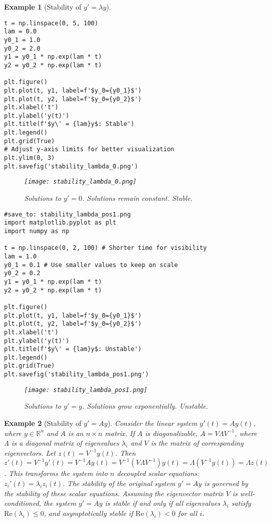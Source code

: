 \documentclass{article}
\newtheorem{example}{Example}
\begin{document}
\begin{example}[Stability of $y' = \lambda y$]
\begin{verbatim}
t = np.linspace(0, 5, 100)
lam = 0.0
y0_1 = 1.0
y0_2 = 2.0
y1 = y0_1 * np.exp(lam * t)
y2 = y0_2 * np.exp(lam * t)

plt.figure()
plt.plot(t, y1, label=f'$y_0={y0_1}$')
plt.plot(t, y2, label=f'$y_0={y0_2}$')
plt.xlabel('t')
plt.ylabel('y(t)')
plt.title(f'$y\' = {lam}y$: Stable')
plt.legend()
plt.grid(True)
# Adjust y-axis limits for better visualization
plt.ylim(0, 3)
plt.savefig('stability_lambda_0.png')
\end{verbatim}

\begin{figure}[h]
    \centering
    \texttt{[image: stability\_lambda\_0.png]}
    \caption{Solutions to $y'=0$. Solutions remain constant. Stable.}
    \label{fig:stability_lambda_0}
\end{figure}

\begin{verbatim}
#save_to: stability_lambda_pos1.png
import matplotlib.pyplot as plt
import numpy as np

t = np.linspace(0, 2, 100) # Shorter time for visibility
lam = 1.0
y0_1 = 0.1 # Use smaller values to keep on scale
y0_2 = 0.2
y1 = y0_1 * np.exp(lam * t)
y2 = y0_2 * np.exp(lam * t)

plt.figure()
plt.plot(t, y1, label=f'$y_0={y0_1}$')
plt.plot(t, y2, label=f'$y_0={y0_2}$')
plt.xlabel('t')
plt.ylabel('y(t)')
plt.title(f'$y\' = {lam}y$: Unstable')
plt.legend()
plt.grid(True)
plt.savefig('stability_lambda_pos1.png')
\end{verbatim}

\begin{figure}[h]
    \centering
    \texttt{[image: stability\_lambda\_pos1.png]}
    \caption{Solutions to $y'=y$. Solutions grow exponentially. Unstable.}
    \label{fig:stability_lambda_pos1}
\end{figure}

\end{example}

\begin{example}[Stability of $y' = Ay$]
Consider the linear system $y'(t) = Ay(t)$, where $y \in \mathbb{R}^n$ and $A$ is an $n \times n$ matrix. If $A$ is diagonalizable, $A = V \Lambda V^{-1}$, where $\Lambda$ is a diagonal matrix of eigenvalues $\lambda_i$ and $V$ is the matrix of corresponding eigenvectors. Let $z(t) = V^{-1} y(t)$. Then $z'(t) = V^{-1} y'(t) = V^{-1} A y(t) = V^{-1} (V \Lambda V^{-1}) y(t) = \Lambda (V^{-1} y(t)) = \Lambda z(t)$.
This transforms the system into $n$ decoupled scalar equations: $z_i'(t) = \lambda_i z_i(t)$. The stability of the original system $y'=Ay$ is governed by the stability of these scalar equations. Assuming the eigenvector matrix $V$ is well-conditioned, the system $y'=Ay$ is stable if and only if all eigenvalues $\lambda_i$ satisfy $\text{Re}(\lambda_i) \le 0$, and asymptotically stable if $\text{Re}(\lambda_i) < 0$ for all $i$.
\end{example}
\end{document}
